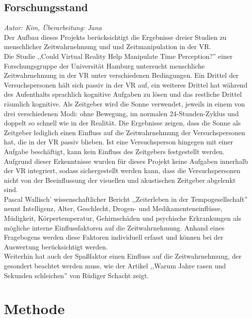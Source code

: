 \documentclass{Paper}
\begin{document}
\subsection{Forschungsstand}
\textit{Autor: Kim, Überarbeitung: Jana}\\
Der Aufbau dieses Projekts berücksichtigt die Ergebnisse dreier Studien zu menschlicher Zeitwahrnehmung und und Zeitmanipulation in der VR.\\
Die Studie ,,Could Virtual Reality Help Manipulate Time Perception?'' einer Forschungsgruppe der Universität Hamburg untersucht menschliche Zeitwahrnehmung in der VR unter verschiedenen Bedingungen. Ein Drittel der Versuchspersonen hält sich passiv in der VR auf, ein weiteres Drittel hat während des Aufenthalts sprachlich kognitive Aufgaben zu lösen und das restliche Drittel räumlich kognitive. 
Als Zeitgeber wird die Sonne verwendet, jeweils in einem von drei verschiedenen Modi: ohne Bewegung, im normalen 24-Stunden-Zyklus und doppelt so schnell wie in der Realität. Die Ergebnisse zeigen, dass die Sonne als Zeitgeber lediglich einen Einfluss auf die Zeitwahrnehmung der Versuchspersonen hat, die in der VR passiv blieben. Ist eine Versuchsperson hingegen mit einer Aufgabe beschäftigt, kann kein Einfluss des Zeitgebers festgestellt werden.\cite{DeviceSystems2016}\\
Aufgrund dieser Erkenntnisse wurden für dieses Projekt keine Aufgaben innerhalb der VR integriert, sodass sichergestellt werden kann, dass die Versuchspersonen nicht von der Beeinflussung der visuellen und akustischen Zeitgeber abgelenkt sind.\\
Pascal Wallisch' wissenschaftlicher Bericht ,,Zeiterleben in der Tempogesellschaft'' nennt Intelligenz, Alter, Geschlecht, Drogen- und Medikamenteneinflüsse, Müdigkeit, Körpertemperatur, Gehirnschäden und psychische Erkrankungen als mögliche interne Einflussfaktoren auf die Zeitwahrnehmung.\cite{Wallisch2003} 
Anhand eines Fragebogens werden diese Faktoren individuell erfasst und können bei der Auswertung berücksichtigt werden.\\
Weiterhin hat auch der Spaßfaktor einen Einfluss auf die Zeitwahrnehmung, der gesondert beachtet werden muss, wie der Artikel ,,Warum Jahre rasen und Sekunden schleichen'' von Rüdiger Schacht zeigt. \cite{Welt24}

\section{Methode}
\end{document}
